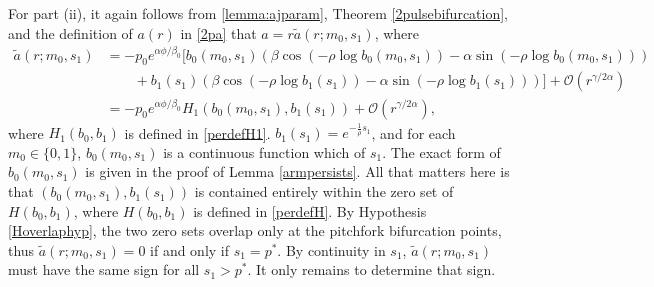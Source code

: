 \documentclass[thesis.tex]{subfiles}
\begin{document}
For part (ii), it again follows from \cref{lemma:ajparam}, Theorem \cref{2pulsebifurcation}, and the definition of $a(r)$ in \cref{2pa} that $a = r \tilde{a}(r; m_0, s_1)$, where
\begin{align*}
\tilde{a}(r; m_0, s_1) &= -p_0 e^{\alpha \phi/\beta_0} \Big[ b_0(m_0, s_1) \left( \beta \cos\left(-\rho \log b_0(m_0, s_1) \right) - \alpha \sin \left(-\rho \log b_0(m_0, s_1) \right) \right) \\
&\qquad+ b_1(s_1) \left( \beta \cos\left(-\rho \log b_1(s_1) \right) - \alpha \sin \left(-\rho \log b_1(s_1) \right) \right) \Big]  + \mathcal{O}(r^{\gamma/2\alpha}) \\
&= -p_0 e^{\alpha \phi/\beta_0} H_1( b_0(m_0, s_1), b_1(s_1) ) + \mathcal{O}(r^{\gamma/2\alpha}),
\end{align*}
where $H_1(b_0, b_1)$ is defined in \cref{perdefH1}.
$b_1(s_1) = e^{-\frac{1}{\rho}s_1}$, and for each $m_0 \in \{ 0, 1 \}$, $b_0(m_0, s_1)$ is a continuous function which of $s_1$. The exact form of $b_0(m_0, s_1)$ is given in the proof of Lemma \ref{armpersists}. All that matters here is that $(b_0(m_0, s_1), b_1(s_1))$ is contained entirely within the zero set of $H(b_0, b_1)$, where $H(b_0, b_1)$ is defined in \cref{perdefH}. By Hypothesis \ref{Hoverlaphyp}, the two zero sets overlap only at the pitchfork bifurcation points, thus $\tilde{a}(r; m_0, s_1) = 0$ if and only if $s_1 = p^*$. By continuity in $s_1$, $\tilde{a}(r; m_0, s_1)$ must have the same sign for all $s_1 > p^*$. It only remains to determine that sign.
\end{document}
